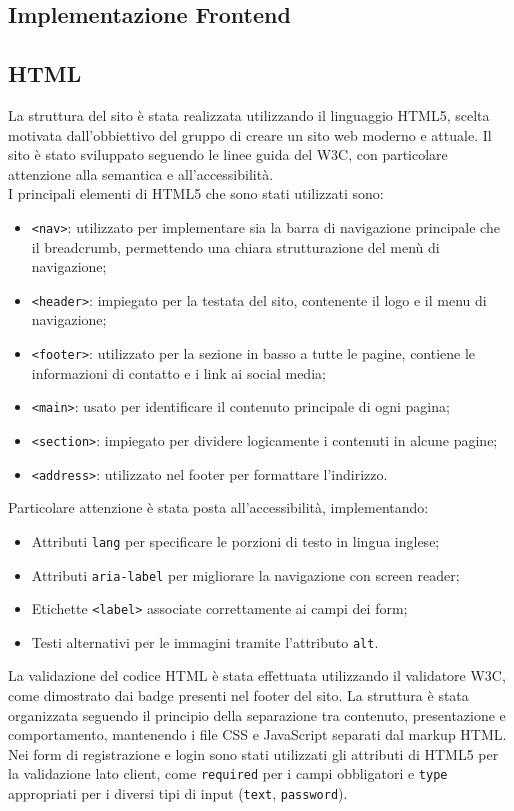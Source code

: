 \documentclass[a4paper, 12pt]{article}
\begin{document}
\begin{justify}
\section{Implementazione Frontend}

\subsection{HTML}
La struttura del sito è stata realizzata utilizzando il linguaggio HTML5, scelta motivata dall'obbiettivo del gruppo di creare un sito web moderno e attuale. Il sito è stato sviluppato seguendo le linee guida del W3C, con particolare attenzione alla semantica e all'accessibilità.\\
I principali elementi di HTML5 che sono stati utilizzati sono:
\begin{itemize}
    \item \texttt{<nav>}: utilizzato per implementare sia la barra di navigazione principale che il breadcrumb, permettendo una chiara strutturazione del menù di navigazione;
    \item \texttt{<header>}: impiegato per la testata del sito, contenente il logo e il menu di navigazione;
    \item \texttt{<footer>}: utilizzato per la sezione in basso a tutte le pagine, contiene le informazioni di contatto e i link ai social media;
    \item \texttt{<main>}: usato per identificare il contenuto principale di ogni pagina;
    \item \texttt{<section>}: impiegato per dividere logicamente i contenuti in alcune pagine;
    \item \texttt{<address>}: utilizzato nel footer per formattare l'indirizzo.
\end{itemize}
Particolare attenzione è stata posta all'accessibilità, implementando:
\begin{itemize}
    \item Attributi \texttt{lang} per specificare le porzioni di testo in lingua inglese;
    \item Attributi \texttt{aria-label} per migliorare la navigazione con screen reader;
    \item Etichette \texttt{<label>} associate correttamente ai campi dei form;
    \item Testi alternativi per le immagini tramite l'attributo \texttt{alt}.
\end{itemize}
La validazione del codice HTML è stata effettuata utilizzando il validatore W3C, come dimostrato dai badge presenti nel footer del sito. La struttura è stata organizzata seguendo il principio della separazione tra contenuto, presentazione e comportamento, mantenendo i file CSS e JavaScript separati dal markup HTML.\\
Nei form di registrazione e login sono stati utilizzati gli attributi di HTML5 per la validazione lato client, come \texttt{required} per i campi obbligatori e \texttt{type} appropriati per i diversi tipi di input (\texttt{text}, \texttt{password}).


\end{justify}
\end{document}
